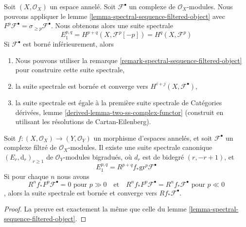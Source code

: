 {\begin{example}
\end{example}

\begin{example}

\label{example-spectral-sequence-bis}

Soit $(X, \mathcal{O}_X)$ un espace annelé. Soit $\mathcal{F}^\bullet$ un complexe de $\mathcal{O}_X$-modules. Nous pouvons appliquer le lemme \ref{lemma-spectral-sequence-filtered-object}
avec $F^p\mathcal{F}^\bullet = \sigma_{\geq p}\mathcal{F}^\bullet$. Nous obtenons alors une suite spectrale
$$
E_1^{p, q} = H^{p + q}(X, \mathcal{F}^p[-p]) = H^q(X, \mathcal{F}^p)
$$
Si $\mathcal{F}^\bullet$ est borné inférieurement, alors

\begin{enumerate}

\item Nous pouvons utiliser la remarque \ref{remark-spectral-sequence-filtered-object}
pour construire cette suite spectrale,
\item la suite spectrale est bornée et converge vers
$H^{i + j}(X, \mathcal{F}^\bullet)$,
\item la suite spectrale est égale à la première suite spectrale de Catégories dérivées, lemme \ref{derived-lemma-two-ss-complex-functor}
(construit en utilisant les résolutions de Cartan-Eilenberg).

\end{enumerate}

\end{example}

\begin{lemma}

\label{lemma-relative-spectral-sequence-filtered-object}
Soit $f : (X, \mathcal{O}_X) \to (Y, \mathcal{O}_Y)$ un morphisme d'espaces annelés, et soit $\mathcal{F}^\bullet$ un complexe filtré de $\mathcal{O}_X$-modules. Il existe une suite spectrale canonique $(E_r, \text{d}_r)_{r \geq 1}$ de $\mathcal{O}_Y$-modules bigradués, où $d_r$ est de bidegré $(r, -r + 1)$, et $$
E_1^{p, q} = R^{p + q}f_*\text{gr}^p\mathcal{F}^\bullet
$$ Si pour chaque $n$ nous avons $$
R^nf_*F^p\mathcal{F}^\bullet = 0 \text{ pour }p \gg 0
\quad\text{et}\quad
R^nf_*F^p\mathcal{F}^\bullet = R^nf_*\mathcal{F}^\bullet \text{ pour }p \ll 0
$$, alors la suite spectrale est bornée et converge vers $Rf_*\mathcal{F}^\bullet$.
\end{lemma}

\begin{proof}

La preuve est exactement la même que celle du lemme \ref{lemma-spectral-sequence-filtered-object}.


\end{proof}}
